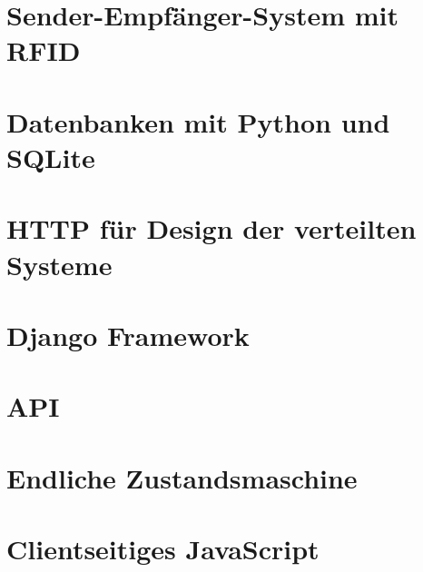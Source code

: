 \section{Sender-Empfänger-System mit RFID}
\label{sec:theorie:rfid}

\section{Datenbanken mit Python und SQLite}
\label{sec:theorie:db}

\section{HTTP für Design der verteilten Systeme}
\label{sec:theorie:http}

\section{Django Framework}
\label{sec:theorie:about_django}

\section{API}
\label{sec:theorie:api}

\section{Endliche Zustandsmaschine}
\label{sec:theorie:fsm}

\section{Clientseitiges JavaScript}
\label{sec:theorie:js}




